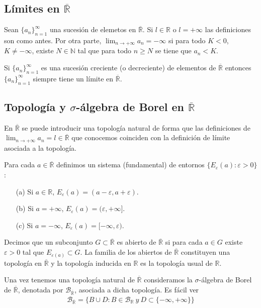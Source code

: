 \subsection{Límites en $\overline{\mathbb{R}}$}
\begin{defi}
    Sean $\{a_n\}_{n = 1}^{\infty}$ una sucesión de elemetos en $\overline{\mathbb{R}}$. Si $l \in \mathbb{R}$ o $l = +\infty$ las definiciones son como antes. Por otra parte, $\lim_{n \to +\infty}{a_n} = -\infty$ si para todo $K < 0$, $K \not = -\infty$, existe $N \in \mathbb{N}$ tal que para todo $n \ge N$ se tiene que $a_n < K$.
\end{defi}
\begin{obs}
    Si $\{a_n\}_{n = 1}^{\infty}$ es una sucesión creciente (o decreciente) de elementos de $\overline{\mathbb{R}}$ entonces $\{a_n\}_{n = 1}^{\infty}$ siempre tiene un límite en $\overline{\mathbb{R}}$.
\end{obs}
\subsection{Topología y $\sigma$-álgebra de Borel en $\overline{\mathbb{R}}$}
En $\overline{\mathbb{R}}$ se puede introducir una topología natural de forma que las definiciones de $\lim_{n \to +\infty}{a_n} = l \in \overline{\mathbb{R}}$ que conocemos coinciden con la definición de límite asociada a la topología.
\begin{defi}
    Para cada $a \in \overline{\mathbb{R}}$ definimos un sistema (fundamental) de entornos $\{ E_{\varepsilon}(a) : \varepsilon > 0\}$:
    \begin{enumerate}
        \item[(a)] Si $a \in \mathbb{R}$, $E_{\varepsilon}(a) = (a-\varepsilon, a+\varepsilon)$.
        \item[(b)] Si $a = +\infty$, $E_{\varepsilon}(a) = (\varepsilon, +\infty]$.
        \item[(c)] Si $a = - \infty$, $E_{\varepsilon}(a) = [-\infty, \varepsilon)$.
    \end{enumerate}
    Decimos que un subconjunto $G \subset \overline{\mathbb{R}}$ es abierto de $\overline{\mathbb{R}}$ si para cada $a \in G$ existe $\varepsilon > 0$ tal que $E_{\varepsilon(a)} \subset G$. La familia de los abiertos de $\overline{\mathbb{R}}$ constituyen una topología en $\overline{\mathbb{R}}$ y la topología inducida en $\mathbb{R}$ es la topología usual de $\mathbb{R}$.
\end{defi}

Una vez tenemos una topología natural de $\overline{\mathbb{R}}$ consideramos la $\sigma$-álgebra de Borel de $\overline{\mathbb{R}}$, denotada por $\mathcal{B}_{\overline{\mathbb{R}}}$, asociada a dicha topología. Es fácil ver
\begin{align*}
    \mathcal{B}_{\overline{\mathbb{R}}} = \{ B \cup D : B \in \mathcal{B}_{\mathbb{R}} \ y \ D \subset \{ -\infty, +\infty\} \}
\end{align*}

